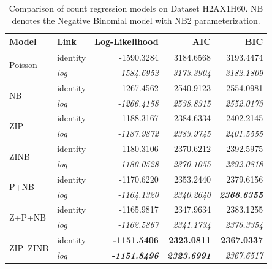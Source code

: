 \begin{table}[!h]
\caption{Comparison of count regression models on Dataset H2AX1H60. NB denotes the Negative Binomial model with NB2 parameterization.}
\centering
\begin{tabular}{llrrr}
\toprule
Model & Link & Log-Likelihood & AIC & BIC \\
\midrule
\multirow[t]{2}{*}{Poisson} & identity & -1590.3284 & 3184.6568 & 3193.4474 \\
 & \textit{log} & \textit{-1584.6952} & \textit{3173.3904} & \textit{3182.1809} \\

\multirow[t]{2}{*}{NB} & identity & -1267.4562 & 2540.9123 & 2554.0981 \\
 & \textit{log} & \textit{-1266.4158} & \textit{2538.8315} & \textit{2552.0173} \\

\multirow[t]{2}{*}{ZIP} & identity & -1188.3167 & 2384.6334 & 2402.2145 \\
 & \textit{log} & \textit{-1187.9872} & \textit{2383.9745} & \textit{2401.5555} \\

\multirow[t]{2}{*}{ZINB} & identity & -1180.3106 & 2370.6212 & 2392.5975 \\
 & \textit{log} & \textit{-1180.0528} & \textit{2370.1055} & \textit{2392.0818} \\

\multirow[t]{2}{*}{P+NB} & identity & -1170.6220 & 2353.2440 & 2379.6156 \\
 & \textit{log} & \textit{-1164.1320} & \textit{2340.2640} & \textbf{\textit{2366.6355}} \\

\multirow[t]{2}{*}{Z+P+NB} & identity & -1165.9817 & 2347.9634 & 2383.1255 \\
 & \textit{log} & \textit{-1162.5867} & \textit{2341.1734} & \textit{2376.3354} \\

\multirow[t]{2}{*}{ZIP--ZINB} & identity & \textbf{-1151.5406} & \textbf{2323.0811} & \textbf{2367.0337} \\
 & \textit{log} & \textbf{\textit{-1151.8496}} & \textbf{\textit{2323.6991}} & \textit{2367.6517} \\

\bottomrule
\end{tabular}
\label{tab:H2AX1H60}
\end{table}

